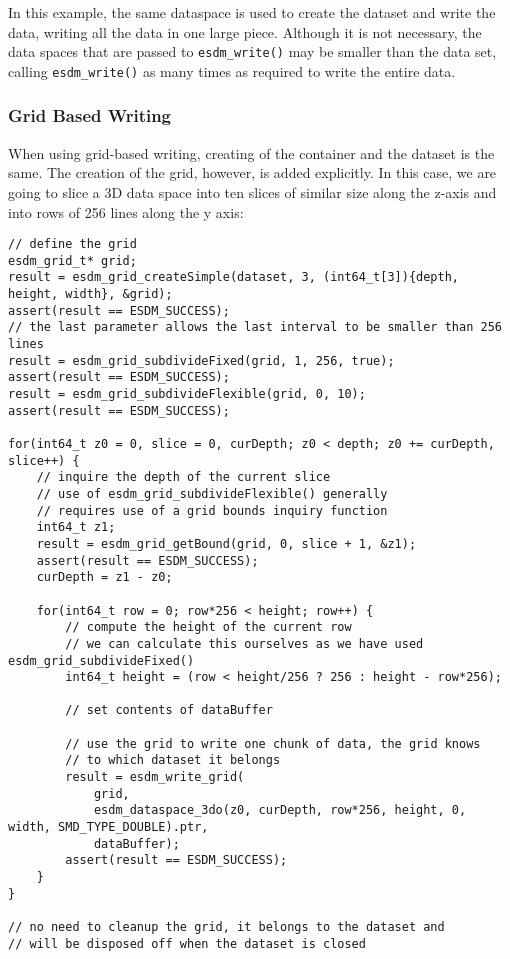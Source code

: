 In this example, the same dataspace is used to create the dataset and write the data, writing all the data in one large piece. 
Although it is not necessary, the data spaces that are passed to \lstinline|esdm_write()| may be smaller than the data set, calling \lstinline|esdm_write()| as many times as required to write the entire data.

\subsubsection{Grid Based Writing}
When using grid-based writing, creating of the container and the dataset is the same. 
The creation of the grid, however, is added explicitly. 
In this case, we are going to slice a 3D data space into ten slices of similar size along the z-axis and into rows of 256 lines along the y axis:

\begin{lstlisting}
// define the grid
esdm_grid_t* grid;
result = esdm_grid_createSimple(dataset, 3, (int64_t[3]){depth, height, width}, &grid);
assert(result == ESDM_SUCCESS);
// the last parameter allows the last interval to be smaller than 256 lines
result = esdm_grid_subdivideFixed(grid, 1, 256, true);  
assert(result == ESDM_SUCCESS);
result = esdm_grid_subdivideFlexible(grid, 0, 10);
assert(result == ESDM_SUCCESS);

for(int64_t z0 = 0, slice = 0, curDepth; z0 < depth; z0 += curDepth, slice++) {
    // inquire the depth of the current slice
    // use of esdm_grid_subdivideFlexible() generally 
    // requires use of a grid bounds inquiry function
    int64_t z1;
    result = esdm_grid_getBound(grid, 0, slice + 1, &z1);
    assert(result == ESDM_SUCCESS);
    curDepth = z1 - z0;

    for(int64_t row = 0; row*256 < height; row++) {
        // compute the height of the current row
        // we can calculate this ourselves as we have used esdm_grid_subdivideFixed()
        int64_t height = (row < height/256 ? 256 : height - row*256);

        // set contents of dataBuffer

        // use the grid to write one chunk of data, the grid knows 
        // to which dataset it belongs
        result = esdm_write_grid(
            grid, 
            esdm_dataspace_3do(z0, curDepth, row*256, height, 0, width, SMD_TYPE_DOUBLE).ptr, 
            dataBuffer);
        assert(result == ESDM_SUCCESS);
    }
}

// no need to cleanup the grid, it belongs to the dataset and 
// will be disposed off when the dataset is closed
\end{lstlisting}

